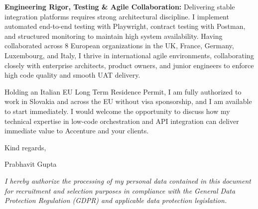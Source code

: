\documentclass[11pt,a4paper]{article}
\begin{document}
\textbf{Engineering Rigor, Testing \& Agile Collaboration:} Delivering stable integration platforms requires strong architectural discipline. I implement automated end-to-end testing with Playwright, contract testing with Postman, and structured monitoring to maintain high system availability. Having collaborated across 8 European organizations in the UK, France, Germany, Luxembourg, and Italy, I thrive in international agile environments, collaborating closely with enterprise architects, product owners, and junior engineers to enforce high code quality and smooth UAT delivery.

Holding an Italian EU Long Term Residence Permit, I am fully authorized to work in Slovakia and across the EU without visa sponsorship, and I am available to start immediately. I would welcome the opportunity to discuss how my technical expertise in low-code orchestration and API integration can deliver immediate value to Accenture and your clients.

Kind regards,

Prabhavit Gupta

\vspace{0.35em}
{\footnotesize \textit{I hereby authorize the processing of my personal data contained in this document for recruitment and selection purposes in compliance with the General Data Protection Regulation (GDPR) and applicable data protection legislation.}\par}
\end{document}
